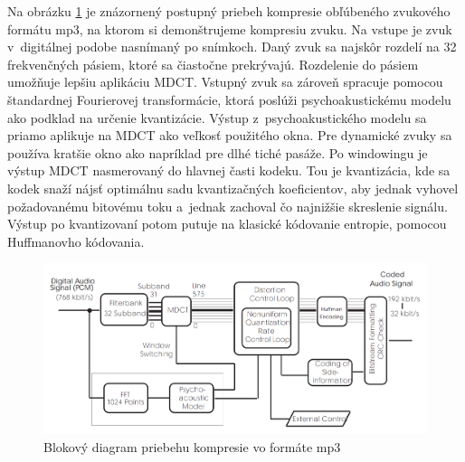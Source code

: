 Na obrázku \ref{fig:mp3_flow_diagram} je znázornený postupný priebeh
kompresie obľúbeného zvukového formátu mp3, na ktorom si demonštrujeme
kompresiu zvuku. Na vstupe je zvuk v~digitálnej podobe nasnímaný po
snímkoch. Daný zvuk sa najskôr rozdelí na 32 frekvenčných pásiem,
ktoré sa čiastočne prekrývajú. Rozdelenie do pásiem umožňuje lepšiu
aplikáciu MDCT. Vstupný zvuk sa zároveň spracuje pomocou štandardnej
Fourierovej transformácie, ktorá poslúži psychoakustickému modelu ako
podklad na určenie kvantizácie. Výstup z~psychoakustického modelu sa
priamo aplikuje na MDCT ako veľkosť použitého okna. Pre dynamické
zvuky sa používa kratšie okno ako napríklad pre dlhé tiché pasáže.
Po windowingu je výstup MDCT nasmerovaný do hlavnej časti kodeku.
Tou je kvantizácia, kde sa kodek snaží nájsť optimálnu sadu
kvantizačných koeficientov, aby jednak vyhovel požadovanému bitovému
toku a~jednak zachoval čo najnižšie skreslenie signálu. Výstup po
kvantizovaní potom putuje na klasické kódovanie entropie, pomocou
Huffmanovho kódovania.

\begin{figure}[htp]
    \centering
    \includegraphics[width=12cm]{obrazky/informatika/audio/mp3_flow_diagram}
    \caption{Blokový diagram priebehu kompresie vo formáte mp3}
    \label{fig:mp3_flow_diagram}
\end{figure}

\nocite{mp3aac}
